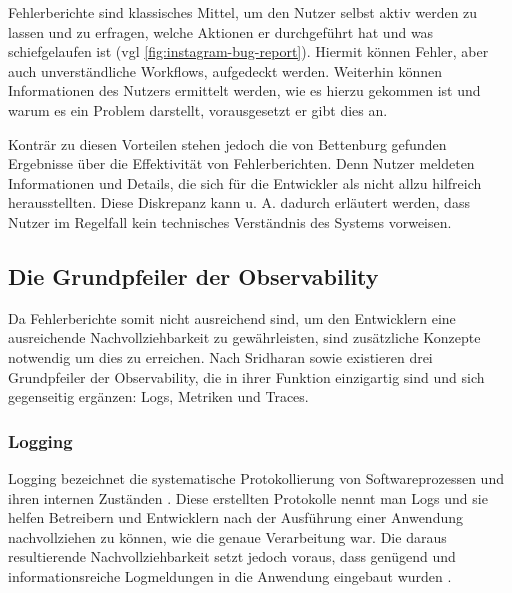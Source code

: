 Fehlerberichte sind klassisches Mittel, um den Nutzer selbst aktiv werden zu lassen und zu erfragen, welche Aktionen er durchgeführt hat und was schiefgelaufen ist (vgl \autoref{fig:instagram-bug-report}). Hiermit können Fehler, aber auch unverständliche Workflows, aufgedeckt werden. Weiterhin können Informationen des Nutzers ermittelt werden, wie es hierzu gekommen ist und warum es ein Problem darstellt, vorausgesetzt er gibt dies an.

Konträr zu diesen Vorteilen stehen jedoch die von Bettenburg \etal \cite{WhatMakesAGoodBugReport} gefunden Ergebnisse über die Effektivität von Fehlerberichten. Denn Nutzer meldeten Informationen und Details, die sich für die Entwickler als nicht allzu hilfreich herausstellten. Diese Diskrepanz kann u. A. dadurch erläutert werden, dass Nutzer im Regelfall kein technisches Verständnis des Systems vorweisen.

\subsection{Die Grundpfeiler der Observability}

Da Fehlerberichte somit nicht ausreichend sind, um den Entwicklern eine ausreichende Nachvollziehbarkeit zu gewährleisten, sind zusätzliche Konzepte notwendig um dies zu erreichen. Nach Sridharan \etal \cite{DistributedSystemsObservability} sowie \cite{TraefikLogsRequestTracingAndMetrics} \cite{IntrospectiveOfTheCloudManagementToolbox} \cite{MultilevelObservabilityInCloudOrchestration} existieren drei Grundpfeiler der Observability, die in ihrer Funktion einzigartig sind und sich gegenseitig ergänzen: Logs, Metriken und Traces.

\subsubsection{Logging}


Logging bezeichnet die systematische Protokollierung von Softwareprozessen und ihren internen Zuständen \cite{LearningToLog}. Diese erstellten Protokolle nennt man Logs und sie helfen Betreibern und Entwicklern nach der Ausführung einer Anwendung nachvollziehen zu können, wie die genaue Verarbeitung war. Die daraus resultierende Nachvollziehbarkeit setzt jedoch voraus, dass genügend und informationsreiche Logmeldungen in die Anwendung eingebaut wurden \cite{LearningToLog}.

